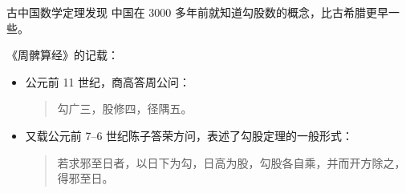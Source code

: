 \begin{frame}{古中国数学}{定理发现}
中国在 3000 多年前就知道勾股数的概念，比古希腊更早一些。

《周髀算经》的记载：
\begin{itemize}
\item 公元前 11 世纪，商高答周公问：
\begin{quote}
勾广三，股修四，径隅五。
\end{quote}
\item 又载公元前 7--6 世纪陈子答荣方问，表述了勾股定理的一般形式：
\begin{quote}
若求邪至日者，以日下为勾，日高为股，勾股各自乘，并而开方除之，得邪至日。
\end{quote}
\end{itemize}
\end{frame}
